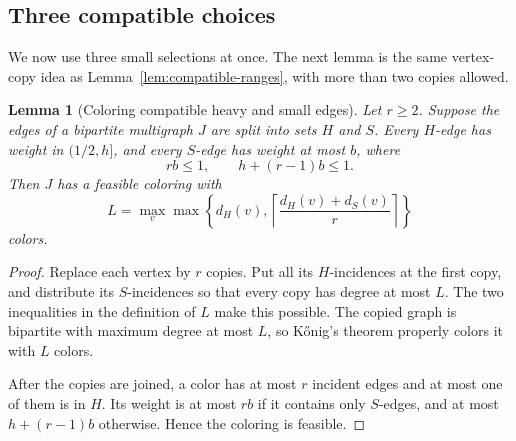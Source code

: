\documentclass[11pt]{article}
\newtheorem{lemma}[theorem]{Lemma}
\theoremstyle{definition}\newtheorem{algorithm}{Algorithm}[section]
\numberwithin{equation}{section}
\theoremstyle{remark}\newtheorem*{remark}{Remark}
\begin{document}
\subsection{Three compatible choices}

We now use three small selections at once.  The next lemma is the same
vertex-copy idea as Lemma~\ref{lem:compatible-ranges}, with more than two
copies allowed.

\begin{lemma}[Coloring compatible heavy and small edges]
\label{lem:compatible-r-copies}
Let $r\ge2$.  Suppose the edges of a bipartite multigraph $J$ are split
into sets $H$ and $S$.  Every $H$-edge has weight in $(1/2,h]$, and every
$S$-edge has weight at most $b$, where
\[
 rb\le1,
 \qquad h+(r-1)b\le1.
\]
Then $J$ has a feasible coloring with
\[
 L=\max_v\max\left\{d_H(v),
       \left\lceil\frac{d_H(v)+d_S(v)}r\right\rceil\right\}
\]
colors.
\end{lemma}
\begin{proof}
Replace each vertex by $r$ copies.  Put all its $H$-incidences at the
first copy, and distribute its $S$-incidences so that every copy has
degree at most $L$.  The two inequalities in the definition of $L$ make
this possible.  The copied graph is bipartite with maximum degree at
most $L$, so K\H{o}nig's theorem properly colors it with $L$ colors.

After the copies are joined, a color has at most $r$ incident edges and
at most one of them is in $H$.  Its weight is at most $rb$ if it contains
only $S$-edges, and at most $h+(r-1)b$ otherwise.  Hence the coloring is
feasible.
\end{proof}
\end{document}
